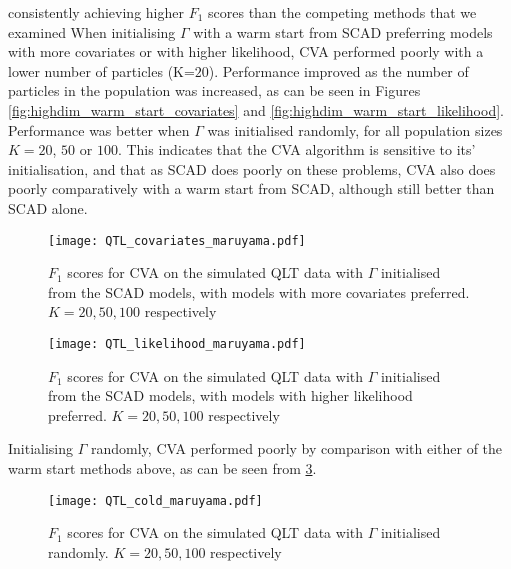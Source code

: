 \documentclass{amsart}[12pt]
\begin{document}
consistently achieving higher $F_1$ scores than the competing methods that we examined
When initialising $\Gamma$ with a warm start from SCAD preferring models with more covariates or with higher
likelihood, CVA performed poorly with a lower number of particles (K=$20$). Performance improved as the number
of particles in the population was increased, as can be seen in Figures
\ref{fig:highdim_warm_start_covariates} and \ref{fig:highdim_warm_start_likelihood}. Performance was better
when $\Gamma$ was initialised randomly, for all population sizes $K=20$, $50$ or $100$. This indicates that
the CVA algorithm is sensitive to its' initialisation, and that as SCAD does poorly on these problems, CVA
also does poorly comparatively with a warm start from SCAD, although still better than SCAD alone.

\begin{figure}\label{fig:QLT_warm_start_covariates}
\caption{$F_1$ scores for CVA on the simulated QLT data with $\Gamma$ initialised from the SCAD models, with
models with more covariates preferred. $K=20, 50, 100$ respectively}
\texttt{[image: QTL\_covariates\_maruyama.pdf]}

\end{figure}

\begin{figure}\label{fig:QLT_warm_start_covariates}
\caption{$F_1$ scores for CVA on the simulated QLT data with $\Gamma$ initialised from the SCAD models, with
models with higher likelihood preferred. $K=20, 50, 100$ respectively}
\texttt{[image: QTL\_likelihood\_maruyama.pdf]}
\end{figure}


Initialising $\Gamma$ randomly, CVA performed poorly by comparison with either of the warm start methods
above, as can be seen from \ref{fig:QLT_cold_start}.
\begin{figure}\label{fig:QLT_cold_start}
\caption{$F_1$ scores for CVA on the simulated QLT data with $\Gamma$ initialised randomly. $K=20, 50, 100$ respectively}
\texttt{[image: QTL\_cold\_maruyama.pdf]}

\end{figure}
\end{document}
